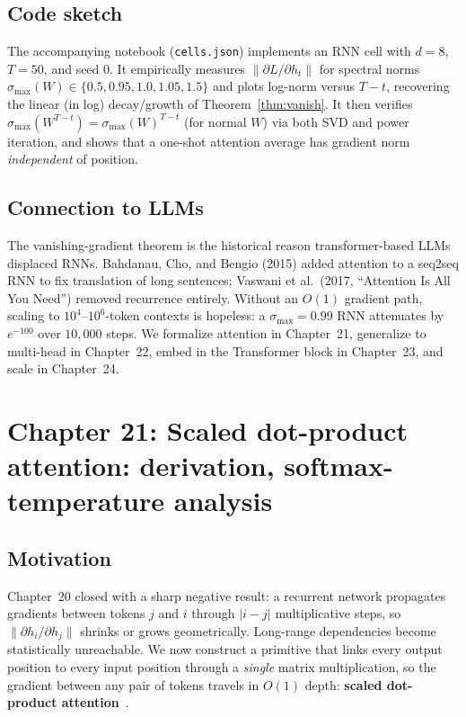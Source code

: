 \documentclass[11pt]{article}
\theoremstyle{remark}
\begin{document}
\subsection*{Code sketch}

The accompanying notebook (\texttt{cells.json}) implements an RNN cell
with $d = 8$, $T = 50$, and seed $0$. It empirically measures
$\|\partial L / \partial h_t\|$ for spectral norms
$\sigma_{\max}(W) \in \{0.5, 0.95, 1.0, 1.05, 1.5\}$ and plots
log-norm versus $T - t$, recovering the linear (in log) decay/growth of
Theorem~\ref{thm:vanish}. It then verifies
$\sigma_{\max}(W^{T-t}) = \sigma_{\max}(W)^{T-t}$ (for normal $W$) via
both SVD and power iteration, and shows that a one-shot attention
average has gradient norm \emph{independent} of position.

\subsection*{Connection to LLMs}

The vanishing-gradient theorem is the historical reason transformer-based
LLMs displaced RNNs. Bahdanau, Cho, and Bengio (2015) added attention
to a seq2seq RNN to fix translation of long sentences; Vaswani et al.\
(2017, ``Attention Is All You Need'') removed recurrence entirely.
Without an $O(1)$ gradient path, scaling to $10^4$--$10^6$-token
contexts is hopeless: a $\sigma_{\max} = 0.99$ RNN attenuates by
$e^{-100}$ over $10{,}000$ steps. We formalize attention in Chapter~21,
generalize to multi-head in Chapter~22, embed in the Transformer block
in Chapter~23, and scale in Chapter~24.


\section*{Chapter 21: Scaled dot-product attention: derivation, softmax-temperature analysis}

\subsection*{Motivation}

Chapter~20 closed with a sharp negative result: a recurrent network propagates gradients between tokens $j$ and $i$ through $|i-j|$ multiplicative steps, so $\|\partial h_i/\partial h_j\|$ shrinks or grows geometrically. Long-range dependencies become statistically unreachable. We now construct a primitive that links every output position to every input position through a \emph{single} matrix multiplication, so the gradient between any pair of tokens travels in $O(1)$ depth: \textbf{scaled dot-product attention}~\cite{Vaswani2017}.
\end{document}
